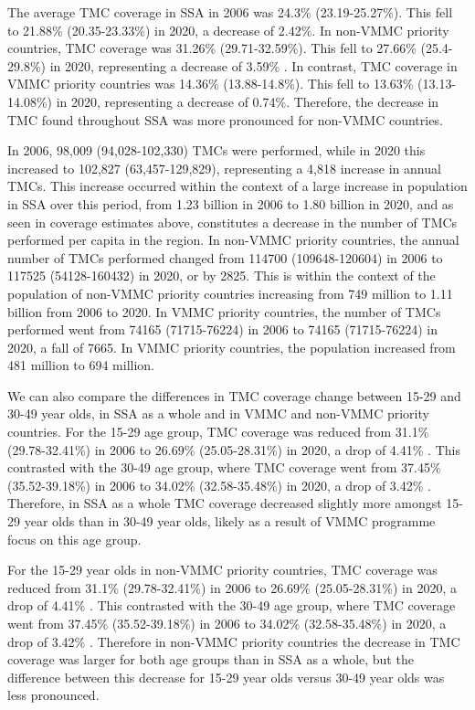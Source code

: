 \documentclass{article}
\begin{document}
The average TMC coverage in SSA in 2006 was 24.3\% (23.19-25.27\%). This fell to 21.88\% (20.35-23.33\%) in 2020, a decrease of 2.42\%. In non-VMMC priority countries, TMC coverage was 31.26\% (29.71-32.59\%). This fell to 27.66\% (25.4-29.8\%) in 2020, representing a decrease of 3.59\% . In contrast, TMC coverage in VMMC priority countries was 14.36\% (13.88-14.8\%). This fell to 13.63\% (13.13-14.08\%) in 2020, representing a decrease of 0.74\%. Therefore, the decrease in TMC found throughout SSA was more pronounced for non-VMMC countries.

In 2006, 98,009 (94,028-102,330) TMCs were performed, while in 2020 this increased to 102,827 (63,457-129,829), representing a 4,818 increase in annual TMCs. This increase occurred within the context of a large increase in population in SSA over this period, from 1.23 billion in 2006 to 1.80 billion in 2020, and as seen in coverage estimates above, constitutes a decrease in the number of TMCs performed per capita in the region. In non-VMMC priority countries, the annual number of TMCs performed changed from 114700 (109648-120604) in 2006 to 117525 (54128-160432) in 2020, or by 2825. This is within the context of the population of non-VMMC priority countries increasing from 749 million to 1.11 billion from 2006 to 2020. In VMMC priority countries, the number of TMCs performed went from 74165 (71715-76224) in 2006 to 74165 (71715-76224) in 2020, a fall of 7665. In VMMC priority countries, the population increased from 481 million to 694 million.

We can also compare the differences in TMC coverage change between 15-29 and 30-49 year olds, in SSA as a whole and in VMMC and non-VMMC priority countries. For the 15-29 age group, TMC coverage was reduced from 31.1\% (29.78-32.41\%) in 2006 to 26.69\% (25.05-28.31\%) in 2020, a drop of 4.41\% . This contrasted with the 30-49 age group, where TMC coverage went from 37.45\% (35.52-39.18\%) in 2006 to 34.02\% (32.58-35.48\%) in 2020, a drop of 3.42\% . Therefore, in SSA as a whole TMC coverage decreased slightly more amongst 15-29 year olds than in 30-49 year olds, likely as a result of VMMC programme focus on this age group.

For the 15-29 year olds in non-VMMC priority countries, TMC coverage was reduced from 31.1\% (29.78-32.41\%) in 2006 to 26.69\% (25.05-28.31\%) in 2020, a drop of 4.41\% . This contrasted with the 30-49 age group, where TMC coverage went from 37.45\% (35.52-39.18\%) in 2006 to 34.02\% (32.58-35.48\%) in 2020, a drop of 3.42\% . Therefore in non-VMMC
priority countries the decrease in TMC coverage was larger for both age groups than in SSA as a whole, but the difference between this decrease for 15-29 year olds versus 30-49 year olds was less pronounced.
\end{document}
